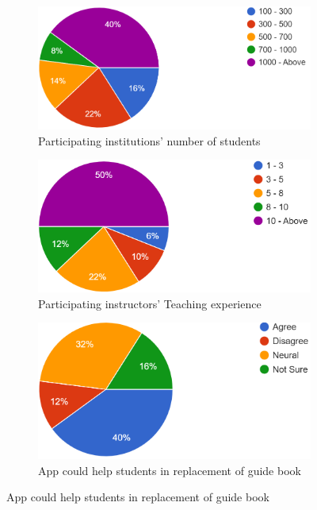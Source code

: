 \documentclass[sn-mathphys,Numbered]{sn-jnl}%
\theoremstyle{thmstyleone}%
\theoremstyle{thmstyletwo}%
\theoremstyle{thmstylethree}%
\begin{document}
\begin{figure}[h!]
\centering
\begin{subfigure}{0.48\textwidth}
    \includegraphics[width=\textwidth]{num_stu.png}
    \caption{Participating institutions' number of students}
    \label{cv}
\end{subfigure}
\hfill
\begin{subfigure}{0.45\textwidth}
    \includegraphics[width=\textwidth]{experience.png}
    \caption{Participating instructors' Teaching experience}
    \label{umass}
\end{subfigure} 
\begin{subfigure}{0.44\textwidth}
    \includegraphics[width=\textwidth]{replace.png}
    \caption{App could help students in replacement of guide book}

\end{subfigure}
\end{figure}
\end{document}
